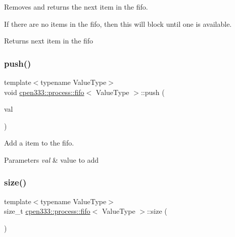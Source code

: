 Removes and returns the next item in the fifo. 

If there are no items in the fifo, then this will block until one is available.

\begin{DoxyReturn}{Returns}
next item in the fifo 
\end{DoxyReturn}
\mbox{\label{classcpen333_1_1process_1_1fifo_a169331a45d9b30c6303ab8300b7901e8}} 
\subsubsection{\texorpdfstring{push()}{push()}}
{\footnotesize\ttfamily template$<$typename Value\+Type$>$ \\
void \hyperlink{classcpen333_1_1process_1_1fifo}{cpen333\+::process\+::fifo}$<$ Value\+Type $>$\+::push (\begin{DoxyParamCaption}\item[{const Value\+Type \&}]{val }\end{DoxyParamCaption})\hspace{0.3cm}{\ttfamily [inline]}}



Add a item to the fifo. 


\begin{DoxyParams}{Parameters}
{\em val} & value to add \\
\hline
\end{DoxyParams}
\mbox{\label{classcpen333_1_1process_1_1fifo_aeaf7bd6333245fad222fcf088e589ad6}} 
\subsubsection{\texorpdfstring{size()}{size()}}
{\footnotesize\ttfamily template$<$typename Value\+Type$>$ \\
size\+\_\+t \hyperlink{classcpen333_1_1process_1_1fifo}{cpen333\+::process\+::fifo}$<$ Value\+Type $>$\+::size (\begin{DoxyParamCaption}{ }\end{DoxyParamCaption})\hspace{0.3cm}{\ttfamily [inline]}}



